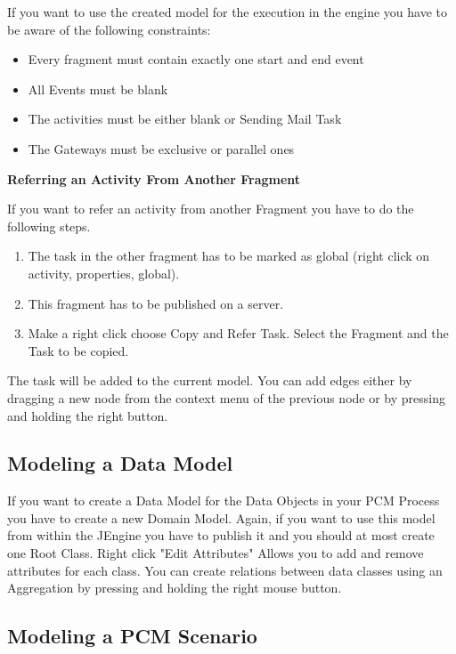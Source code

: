 If you want to use the created model for the execution in the engine you have to be aware of the following constraints:

\begin{itemize}
\item Every fragment must contain exactly one start and end event
\item All Events must be blank
\item The activities must be either blank or Sending Mail Task
\item The Gateways must be exclusive or parallel ones
\end{itemize}

\noindent
\textbf{Referring an Activity From Another Fragment}

\noindent
If you want to refer an activity from another Fragment you have to do the following steps.
\begin{enumerate}
\item The task in the other fragment has to be marked as global (right click on activity, properties, global).
\item This fragment has to be published on a server.
\item Make a right click choose Copy and Refer Task. Select the Fragment and the Task to be copied.
\end{enumerate} 
The task will be added to the current model.
\noindent
You can add edges either by dragging a new node from the context menu of the previous node or by pressing and holding the right button.

\subsection{Modeling a Data Model}

If you want to create a Data Model for the Data Objects in your PCM Process you have to create a new Domain Model. Again, if you want to use this model from within the JEngine you have to publish it and you should at most create one Root Class.
Right click "Edit Attributes" Allows you to add and remove attributes for each class.
You can create relations between data classes using an Aggregation by pressing and holding the right mouse button.

\subsection{Modeling a PCM Scenario}

